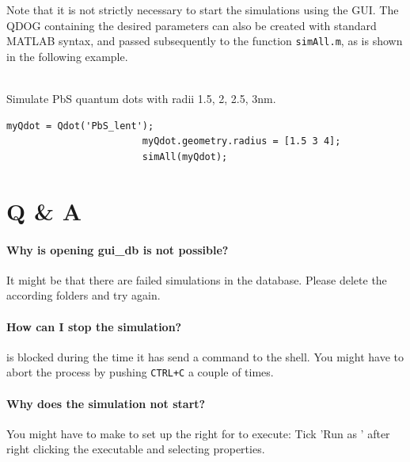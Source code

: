				\\\\
				Note that it is not strictly necessary to start the simulations using the GUI. The \gls{QDOG} containing the desired parameters can also be created with 
				standard MATLAB syntax, and passed subsequently to the function \lstinline{simAll.m}, as is shown in the following example.\\
				\\
				\begin{EXAMPLE} Simulate PbS  quantum dots with radii 1.5, 2, 2.5, 3nm. 
					\begin{lstlisting}[frame = none]
						myQdot = Qdot('PbS_lent');
						myQdot.geometry.radius = [1.5 3 4]; 
						simAll(myQdot);\end{lstlisting}
				\end{EXAMPLE}
					
	\section{Q \& A}
		\paragraph{Why is opening gui\_db is not possible?} It might be that there are failed simulations in the
		database. Please delete the according folders and try again.
		
		\paragraph{How can I stop the simulation?} \matlab is blocked during
			the time it has send a command to the shell. You might have to abort the process by pushing \lstinline{CTRL+C}
			a couple of times.
		
		\paragraph{Why does the simulation not start?}
			You might have to make to set up the right for \omen to execute: Tick 'Run as ' after right clicking
			the \omen executable and selecting properties.